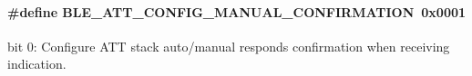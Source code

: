 \paragraph[{\texorpdfstring{B\+L\+E\+\_\+\+A\+T\+T\+\_\+\+C\+O\+N\+F\+I\+G\+\_\+\+M\+A\+N\+U\+A\+L\+\_\+\+C\+O\+N\+F\+I\+R\+M\+A\+T\+I\+ON}{BLE_ATT_CONFIG_MANUAL_CONFIRMATION}}]{\setlength{\rightskip}{0pt plus 5cm}\#define B\+L\+E\+\_\+\+A\+T\+T\+\_\+\+C\+O\+N\+F\+I\+G\+\_\+\+M\+A\+N\+U\+A\+L\+\_\+\+C\+O\+N\+F\+I\+R\+M\+A\+T\+I\+ON~0x0001}\hypertarget{group___b_l_e___a_t_t___c_o_n_f_i_g_u_r_a_t_i_o_n___b_i_t_s_gad769e6bbe9fd4000da7c39b3ef329412}{}\label{group___b_l_e___a_t_t___c_o_n_f_i_g_u_r_a_t_i_o_n___b_i_t_s_gad769e6bbe9fd4000da7c39b3ef329412}
bit 0\+: Configure A\+TT stack auto/manual responds confirmation when receiving indication. 
